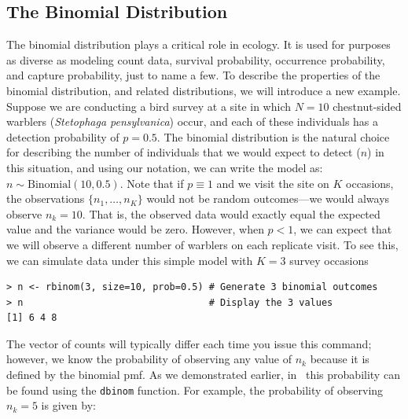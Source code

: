 \subsection{The Binomial Distribution}

The binomial distribution plays a critical role in ecology. It is
used for purposes as diverse as modeling count data, survival
probability, occurrence probability, and capture probability, just to
name a few.
To describe the properties of the binomial distribution, and related
distributions, we will introduce a new example.
Suppose we are conducting a bird survey at a site in which $N=10$
chestnut-sided warblers (\textit{Stetophaga pensylvanica}) occur, and
each of these individuals has a detection probability of $p=0.5$. The
binomial distribution is the natural choice for describing the number
of individuals that we would expect to detect ($n$) in this
situation, and using our notation, we can write the model as: $n \sim
\text{Binomial}(10, 0.5)$. Note that if $p \equiv 1$ and we visit the
site on $K$ occasions, the observations $\{n_1, \ldots, n_K\}$
would not be random outcomes---we would always observe
$n_k=10$. That is, the observed data would exactly equal the expected
value and the variance would be zero.
However, when $p<1$, we can expect that we will observe
a different number of warblers on each replicate visit. To see this,
we can simulate data under this simple model with $K=3$ survey occasions
\begin{verbatim}
> n <- rbinom(3, size=10, prob=0.5) # Generate 3 binomial outcomes
> n                                 # Display the 3 values
[1] 6 4 8
\end{verbatim}
The vector of counts will typically differ each time you issue this
command; however, we know the probability of observing any value of
$n_k$ because it is defined by the binomial pmf. As we demonstrated
earlier, in \R~this probability can be found using the \verb+dbinom+
function. For example, the probability of observing $n_k=5$ is given by:


